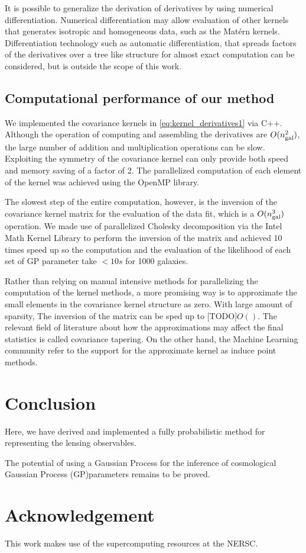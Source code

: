 It is possible to generalize the derivation of derivatives by using numerical
differentiation. Numerical differentiation may allow evaluation of other
kernels that generates isotropic and homogeneous data, 
such as the Mat\'{e}rn kernels.
Differentiation technology such as automatic differentiation, 
that spreads factors of the derivatives over a tree like structure for
almost exact computation can be considered, but is outside the scope of this work.

\subsection{Computational performance of our method}
We implemented the covariance kernels in \ref{eq:kernel_derivatives1}
via {\sc C++}. Although the operation of computing and assembling the
derivatives are $O(n_{\rm gal}^2)$, the large number of addition and 
multiplication operations can be slow.
Exploiting the symmetry of the covariance kernel can only provide both speed and
memory saving of a factor of 2.
The parallelized computation of each element of the kernel was achieved using 
the OpenMP library.  

The slowest step of the entire computation, however, is the inversion of the
covariance kernel matrix for the evaluation of the data fit, 
which is a $O(n_{\rm gal}^3)$ operation. 
We made use of parallelized Cholesky decomposition via the Intel Math Kernel Library
to perform the inversion of the matrix and achieved 10 times speed up so the
computation and the evaluation of the likelihood of each set of GP parameter
take $< 10s$ for 1000 galaxies.

Rather than relying on manual intensive methods for parallelizing the
computation of the kernel methods, a more promising way is to approximate the
small elements in the covariance kernel structure as zero. With large amount of
sparsity, The inversion of the matrix can be sped up to [TODO]$O()$.
The relevant field of literature about how the approximations may affect the
final statistics is called covariance tapering. On the other hand,  
the Machine Learning community refer to the support for the approximate kernel
as induce point methods.


\section{Conclusion}
Here, we have derived and implemented a fully probabilistic method for representing 
the lensing observables. 

The potential of using a Gaussian Process for the inference of cosmological 
Gaussian Process (GP)parameters remains to be proved. 

\section{Acknowledgement}
This work makes use of the supercomputing resources at the NERSC.
